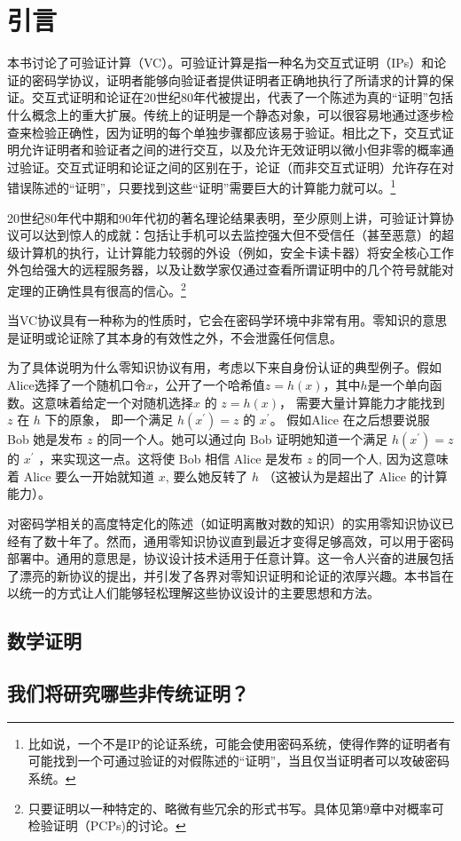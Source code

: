

\chapter{引言}

本书讨论了可验证计算（VC）。可验证计算是指一种名为交互式证明（IPs）和论证的密码学协议，证明者能够向验证者提供证明者正确地执行了所请求的计算的保证。交互式证明和论证在20世纪80年代被提出，代表了一个陈述为真的“证明”包括什么概念上的重大扩展。传统上的证明是一个静态对象，可以很容易地通过逐步检查来检验正确性，因为证明的每个单独步骤都应该易于验证。相比之下，交互式证明允许证明者和验证者之间的进行交互，以及允许无效证明以微小但非零的概率通过验证。交互式证明和论证之间的区别在于，论证（而非交互式证明）允许存在对错误陈述的“证明”，只要找到这些“证明”需要巨大的计算能力就可以。\footnote{比如说，一个不是IP的论证系统，可能会使用密码系统，使得作弊的证明者有可能找到一个可通过验证的对假陈述的“证明”，当且仅当证明者可以攻破密码系统。}

20世纪80年代中期和90年代初的著名理论结果表明，至少原则上讲，可验证计算协议可以达到惊人的成就：包括让手机可以去监控强大但不受信任（甚至恶意）的超级计算机的执行，让计算能力较弱的外设（例如，安全卡读卡器）将安全核心工作外包给强大的远程服务器，以及让数学家仅通过查看所谓证明中的几个符号就能对定理的正确性具有很高的信心。\footnote{只要证明以一种特定的、略微有些冗余的形式书写。具体见第9章中对概率可检验证明（PCPs)的讨论。}


当VC协议具有一种称为的性质时，它会在密码学环境中非常有用。零知识的意思是证明或论证除了其本身的有效性之外，不会泄露任何信息。

为了具体说明为什么零知识协议有用，考虑以下来自身份认证的典型例子。假如Alice选择了一个随机口令$x$，公开了一个哈希值$z=h(x)$，其中$h$是一个单向函数。这意味着给定一个对随机选择$x$ 的 $z=h(x)$， 需要大量计算能力才能找到 $z$ 在 $h$ 下的原象， 即一个满足 $h\left(x^{\prime}\right)=z$ 的 $x^{\prime}$。 假如Alice 在之后想要说服 Bob 她是发布 $z$ 的同一个人。她可以通过向 Bob 证明她知道一个满足 $h\left(x^{\prime}\right)=z$ 的 $x^{\prime}$ ，来实现这一点。这将使 Bob 相信 Alice 是发布 $z$ 的同一个人, 因为这意味着 Alice 要么一开始就知道 $x$, 要么她反转了 $h$ （这被认为是超出了 Alice 的计算能力）。



对密码学相关的高度特定化的陈述（如证明离散对数的知识\cite{Sch89}）的实用零知识协议已经有了数十年了。然而，通用零知识协议直到最近才变得足够高效，可以用于密码部署中。通用的意思是，协议设计技术适用于任意计算。这一令人兴奋的进展包括了漂亮的新协议的提出，并引发了各界对零知识证明和论证的浓厚兴趣。本书旨在以统一的方式让人们能够轻松理解这些协议设计的主要思想和方法。



\section{数学证明}
\section{我们将研究哪些非传统证明？}